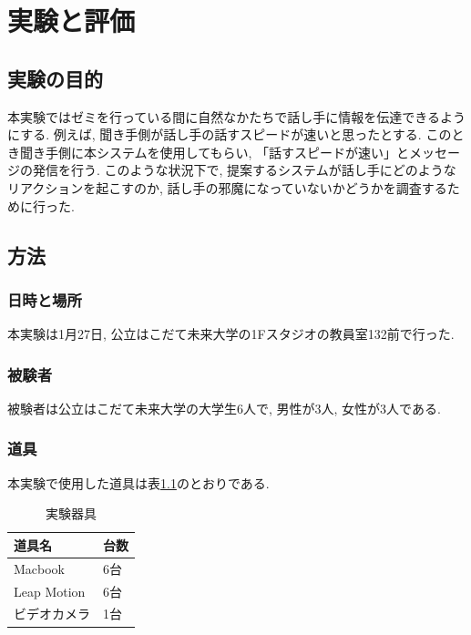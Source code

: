 \documentclass{funthesis}
\begin{document}


\chapter{実験と評価}

\section{実験の目的}
本実験ではゼミを行っている間に自然なかたちで話し手に情報を伝達できるようにする. 例えば,  聞き手側が話し手の話すスピードが速いと思ったとする. このとき聞き手側に本システムを使用してもらい, 「話すスピードが速い」とメッセージの発信を行う. このような状況下で, 提案するシステムが話し手にどのようなリアクションを起こすのか, 話し手の邪魔になっていないかどうかを調査するために行った. 

\section{方法}
\subsection{日時と場所}

本実験は1月27日, 公立はこだて未来大学の1Fスタジオの教員室132前で行った. 

\subsection{被験者}
被験者は公立はこだて未来大学の大学生6人で, 男性が3人, 女性が3人である. 

\subsection{道具}
本実験で使用した道具は表\ref{tools}のとおりである. 

\begin{table}[H]
\begin{center}
\caption{実験器具}
  \begin{tabular}{ll}
   \hline
   道具名 & 台数\\
   \hline
   Macbook & 6台\\
   \hline
   Leap Motion & 6台\\ 
   \hline
  ビデオカメラ & 1台\\ 
   \hline
   \end{tabular}
   \label{tools}
  \end{center}
\end{table}
\end{document}
